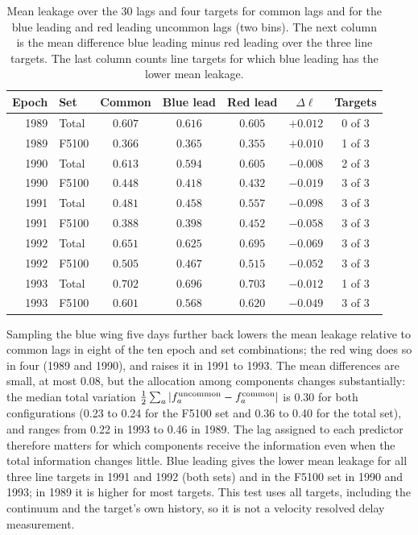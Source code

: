 \documentclass[fleqn,usenatbib]{mnras}
\newenvironment{SURDtable}{\begin{table}}{\end{table}}
\begin{document}
\begin{SURDtable}
\centering
\caption{Mean leakage over the 30 lags and four targets for common lags and for the
blue leading and red leading uncommon lags (two bins). The next column is the
mean difference blue leading minus red leading over the three line targets. The last
column counts line targets for which blue leading has the lower mean leakage.}
\label{tab:ep_config}
\small
\begin{tabular}{rlccccc}
\toprule
Epoch & Set & Common & Blue lead & Red lead & $\Delta\ell$ & Targets \\
\midrule
1989 & Total & $0.607$ & $0.616$ & $0.605$ & $+0.012$ & 0 of 3 \\
1989 & F5100 & $0.366$ & $0.365$ & $0.355$ & $+0.010$ & 1 of 3 \\
1990 & Total & $0.613$ & $0.594$ & $0.605$ & $-0.008$ & 2 of 3 \\
1990 & F5100 & $0.448$ & $0.418$ & $0.432$ & $-0.019$ & 3 of 3 \\
1991 & Total & $0.481$ & $0.458$ & $0.557$ & $-0.098$ & 3 of 3 \\
1991 & F5100 & $0.388$ & $0.398$ & $0.452$ & $-0.058$ & 3 of 3 \\
1992 & Total & $0.651$ & $0.625$ & $0.695$ & $-0.069$ & 3 of 3 \\
1992 & F5100 & $0.505$ & $0.467$ & $0.515$ & $-0.052$ & 3 of 3 \\
1993 & Total & $0.702$ & $0.696$ & $0.703$ & $-0.012$ & 1 of 3 \\
1993 & F5100 & $0.601$ & $0.568$ & $0.620$ & $-0.049$ & 3 of 3 \\
\bottomrule
\end{tabular}

\end{SURDtable}

Sampling the blue wing five days further back lowers the mean leakage relative to
common lags in eight of the ten epoch and set combinations; the red wing does so in
four (1989 and 1990), and raises it in 1991 to 1993. The mean differences are small,
at most 0.08, but the allocation among components changes substantially: the median
total variation $\frac12\sum_a|f_a^{\rm uncommon}-f_a^{\rm common}|$ is 0.30 for both
configurations (0.23 to 0.24 for the F5100 set and 0.36 to 0.40 for the total set),
and ranges from 0.22 in 1993 to 0.46 in 1989. The lag assigned to each predictor
therefore matters for which components receive the information even when the total
information changes little. Blue leading gives the lower mean leakage for all three line
targets in 1991 and 1992 (both sets) and in the F5100 set in 1990 and 1993; in 1989 it is
higher for most targets. This test uses all targets, including the continuum
and the target's own history, so it is not a velocity resolved delay measurement.
\end{document}
